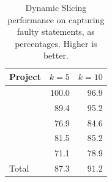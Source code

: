 \documentclass{article}
\begin{document}
\begin{table}[h]
  \small
	\centering
	\setlength{\tabcolsep}{4pt}
	\begin{tabular}{lrr}
		\toprule
		Project             &  \multicolumn{1}{c}{$k=5$} & \multicolumn{1}{c}{$k=10$} \\ %
		\midrule

        \lang{}            & 100.0 & 96.9\\
        \cmath{}           & 89.4 & 95.2\\
		\chart{}			& 76.9 & 84.6 \\
        \jtime{}            & 81.5 & 85.2\\
        \mockito{}          & 71.1 & 78.9\\\midrule
        Total          & 87.3 & 91.2\\


		\bottomrule
	\end{tabular}
	\caption {Dynamic Slicing performance on capturing faulty statements, as
     percentages. Higher is better.}
   \label{tab:ds-cases-captured}

\end{table}


\end{document}
